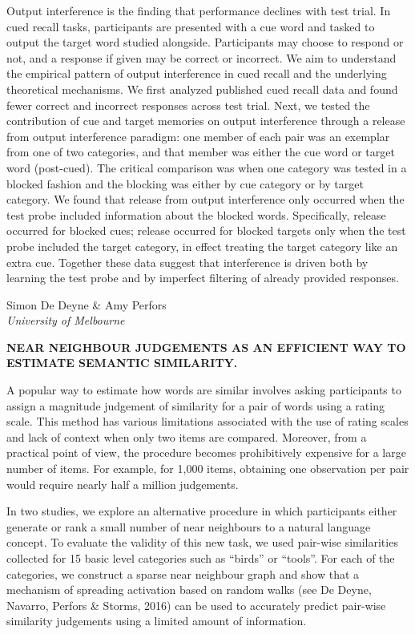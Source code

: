 \documentclass[]{article}
\begin{document}
Output interference is the finding that performance declines with test
trial. In cued recall tasks, participants are presented with a cue word
and tasked to output the target word studied alongside. Participants may
choose to respond or not, and a response if given may be correct or
incorrect. We aim to understand the empirical pattern of output
interference in cued recall and the underlying theoretical mechanisms.
We first analyzed published cued recall data and found fewer correct and
incorrect responses across test trial. Next, we tested the contribution
of cue and target memories on output interference through a release from
output interference paradigm: one member of each pair was an exemplar
from one of two categories, and that member was either the cue word or
target word (post-cued). The critical comparison was when one category
was tested in a blocked fashion and the blocking was either by cue
category or by target category. We found that release from output
interference only occurred when the test probe included information
about the blocked words. Specifically, release occurred for blocked
cues; release occurred for blocked targets only when the test probe
included the target category, in effect treating the target category
like an extra cue. Together these data suggest that interference is
driven both by learning the test probe and by imperfect filtering of
already provided responses.\\
\pagebreak  

Simon De Deyne \& Amy Perfors\\
\emph{University of Melbourne}

\textbf{NEAR NEIGHBOUR JUDGEMENTS AS AN EFFICIENT WAY TO ESTIMATE
SEMANTIC SIMILARITY.}

A popular way to estimate how words are similar involves asking
participants to assign a magnitude judgement of similarity for a pair of
words using a rating scale. This method has various limitations
associated with the use of rating scales and lack of context when only
two items are compared. Moreover, from a practical point of view, the
procedure becomes prohibitively expensive for a large number of items.
For example, for 1,000 items, obtaining one observation per pair would
require nearly half a million judgements.

In two studies, we explore an alternative procedure in which
participants either generate or rank a small number of near neighbours
to a natural language concept. To evaluate the validity of this new
task, we used pair-wise similarities collected for 15 basic level
categories such as ``birds'' or ``tools''. For each of the categories,
we construct a sparse near neighbour graph and show that a mechanism of
spreading activation based on random walks (see De Deyne, Navarro,
Perfors \& Storms, 2016) can be used to accurately predict pair-wise
similarity judgements using a limited amount of information.
\end{document}
